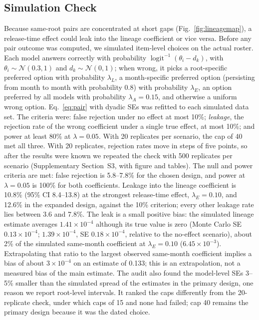 \documentclass{ieeeaccess}
\theoremstyle{definition}
\theoremstyle{plain}
\begin{document}
\subsection{Simulation Check}
\label{sec:gate}
Because same-root pairs are concentrated at short gaps (Fig.~\ref{fig:lineagemap}), a release-time effect could leak into the lineage coefficient or vice versa. Before any pair outcome was computed, we simulated item-level choices on the actual roster. Each model answers correctly with probability $\operatorname{logit}^{-1}(\theta_i - d_k)$, with $\theta_i \sim \mathcal{N}(0.3, 1)$ and $d_k \sim \mathcal{N}(0, 1)$; when wrong, it picks a root-specific preferred option with probability $\lambda_L$, a month-specific preferred option (persisting from month to month with probability 0.8) with probability $\lambda_E$, an option preferred by all models with probability $\lambda_A = 0.15$, and otherwise a uniform wrong option. Eq.~\eqref{eq:pair} with dyadic SEs was refitted to each simulated data set. The criteria were: false rejection under no effect at most 10\%; \emph{leakage}, the rejection rate of the wrong coefficient under a single true effect, at most 10\%; and power at least 80\% at $\lambda = 0.05$. With 20 replicates per scenario, the cap of 40 met all three. With 20 replicates, rejection rates move in steps of five points, so after the results were known we repeated the check with 500 replicates per scenario (Supplementary Section~S3, with figure and tables). The null and power criteria are met: false rejection is 5.8--7.8\% for the chosen design, and power at $\lambda = 0.05$ is 100\% for both coefficients. Leakage into the lineage coefficient is 10.8\% (95\% CI 8.4--13.8) at the strongest release-time effect, $\lambda_E = 0.10$, and 12.6\% in the expanded design, against the 10\% criterion; every other leakage rate lies between 3.6 and 7.8\%. The leak is a small positive bias: the simulated lineage estimate averages $1.41 \times 10^{-4}$ although its true value is zero (Monte Carlo SE $0.13 \times 10^{-4}$; $1.39 \times 10^{-4}$, SE $0.18 \times 10^{-4}$, relative to the no-effect scenario), about 2\% of the simulated same-month coefficient at $\lambda_E = 0.10$ ($6.45 \times 10^{-3}$). Extrapolating that ratio to the largest observed same-month coefficient implies a bias of about $3 \times 10^{-4}$ on an estimate of 0.133; this is an extrapolation, not a measured bias of the main estimate. The audit also found the model-level SEs 3--5\% smaller than the simulated spread of the estimates in the primary design, one reason we report root-level intervals. It ranked the caps differently from the 20-replicate check, under which caps of 15 and none had failed; cap 40 remains the primary design because it was the dated choice.
\end{document}
